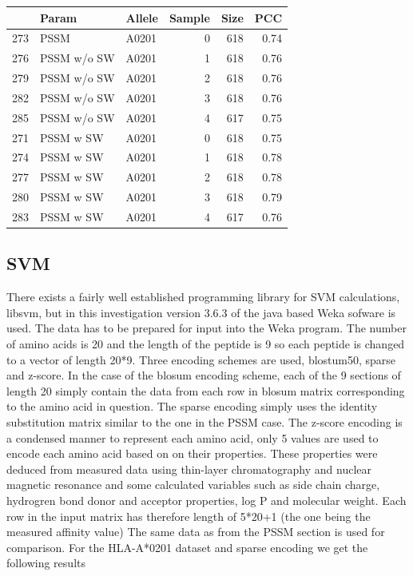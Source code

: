 \begin{table}[ht]
\begin{center}
\begin{tabular}{rllrrr}
  \hline
 & Param & Allele & Sample & Size & PCC \\ 
  \hline
273 & PSSM & A0201 &   0 & 618 & 0.74 \\ 
  276 & PSSM w/o SW & A0201 &   1 & 618 & 0.76 \\ 
  279 & PSSM w/o SW & A0201 &   2 & 618 & 0.76 \\ 
  282 & PSSM w/o SW & A0201 &   3 & 618 & 0.76 \\ 
  285 & PSSM w/o SW & A0201 &   4 & 617 & 0.75 \\ 
  271 & PSSM w SW & A0201 &   0 & 618 & 0.75 \\ 
  274 & PSSM w SW & A0201 &   1 & 618 & 0.78 \\ 
  277 & PSSM w SW & A0201 &   2 & 618 & 0.78 \\ 
  280 & PSSM w SW & A0201 &   3 & 618 & 0.79 \\ 
  283 & PSSM w SW & A0201 &   4 & 617 & 0.76 \\ 
   \hline
\end{tabular}
\end{center}
\end{table}


\subsection{SVM}
There exists a fairly well established programming library for SVM calculations, libsvm, but in this investigation version 3.6.3 of the java based Weka sofware is used. 
The data has to be prepared for input into the Weka program. 
The number of amino acids is 20 and the length of the peptide is 9 so each peptide is changed to a vector of length 20*9. 
Three encoding schemes are used, blostum50, sparse and z-score. 
In the case of the blosum encoding scheme, each of the 9 sections of length 20 simply contain the data from each row in blosum matrix corresponding to the amino acid in question.
The sparse encoding simply uses the identity substitution matrix similar to the one in the PSSM case. 
The z-score encoding is a condensed manner to represent each amino acid, only 5 values are used to encode each amino acid based on on their properties. 
These properties were deduced from measured data using thin-layer chromatography and nuclear magnetic resonance and some calculated variables 
such as side chain charge, hydrogren bond donor and acceptor properties, log P and molecular weight. 
Each row in the input matrix has therefore length of 5*20+1 (the one being the measured affinity value)
The same data as from the PSSM section is used for comparison. For the HLA-A*0201 dataset and sparse encoding we get the following results

